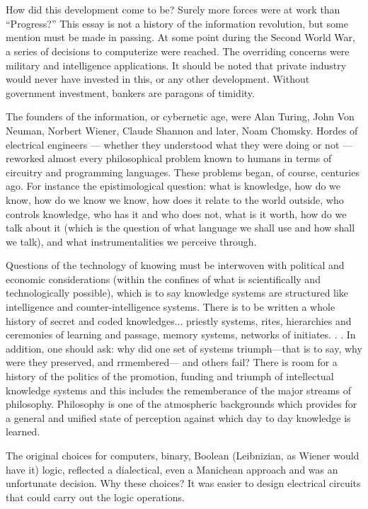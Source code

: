 \documentclass[11pt,twoside,draft]{memoir}
\begin{document}
\chapter{}

How did this development come to be?
Surely more forces were at work than \enquote{Progress?} 
This essay is not a history of the
information
revolution, but some
mention
must be made in passing. At some point
during the Second
World
War, a series of
decisions to computerize were reached. The
overriding concerns were military and intelligence applications. It should be noted that
private industry would never have invested
in this, or any other development. Without
government investment, bankers are paragons of timidity.

The founders of the information, or cybernetic age, were Alan Turing, John Von
Neuman, Norbert Wiener, Claude Shannon
and later, Noam Chomsky. Hordes of electrical engineers --- whether they understood
what they were doing or not --- reworked almost every philosophical problem known to
humans in terms of circuitry and programming languages. These problems began, of
course, centuries ago. For instance the epistimological question: what is knowledge,
how do we know, how do we know we
know, how does it relate to the world outside, who controls knowledge, who has it
and who does not, what is it worth, how do
we talk about it (which is the question of
what language we shall use and how shall
we talk), and what instrumentalities we perceive through.

Questions of the technology of knowing
must be interwoven with political and economic
considerations (within the confines
of what is scientifically and technologically
possible), which is to say knowledge systems are structured like intelligence and
counter-intelligence systems. There is to be
written a whole history of secret and coded
knowledges... priestly systems, rites, hierarchies and ceremonies of learning and
passage, memory systems, networks of initiates. . . In addition, one should ask: why did
one set of systems triumph—that is to say,
why were they preserved, and rrmembered—
and others fail? There is room for a history of
the politics of the promotion, funding and
triumph of intellectual knowledge systems
and this includes the rememberance of the
major streams of philosophy. Philosophy is
one of the atmospheric backgrounds which
provides for a general and unified state of
perception against which day to day knowledge is learned.

The original choices for computers, binary, Boolean (Leibnizian, as Wiener would
have it) logic, reflected a dialectical, even a
Manichean approach and was an unfortunate decision. Why these choices? It was
easier to design electrical circuits that could
carry out the logic operations.
\end{document}
